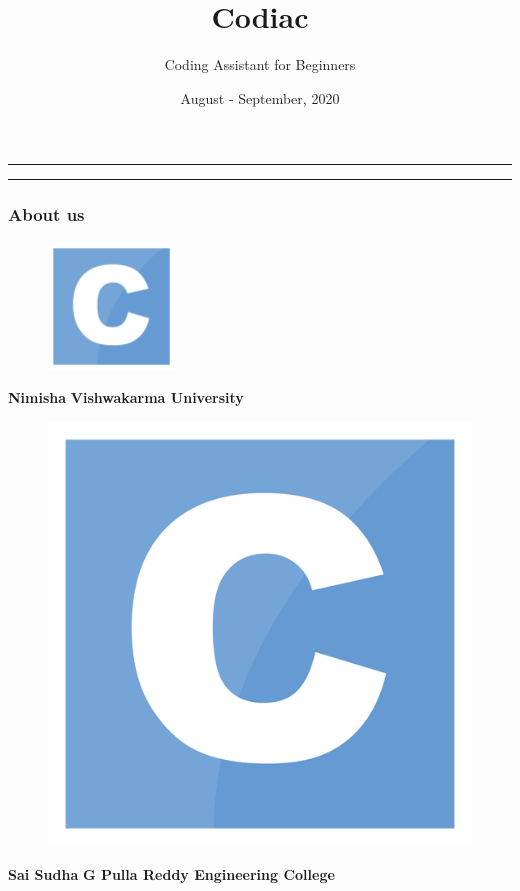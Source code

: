 \documentclass[14pt]{beamer}
\title[Codiac]{Codiac}
\author[]{Coding Assistant for Beginners}
\date []{August - September, 2020}
\begin{document}
\begin{frame}
    \noindent
    {\color{pink} \rule{\linewidth}{0.7mm} }
    \titlepage
    \noindent
    {\color{pink} \rule{\linewidth}{0.7mm} }
\end{frame}

\begin{frame}
   \frametitle{About us}
	\begin{minipage}[width=0.3\textwidth]
            \begin{figure}
		    \includegraphics[width=0.3\textwidth]{./Codiac/logos/c.png}
                    \end{figure}
		\textbf{Nimisha}
		\textbf{Vishwakarma University}
	\end{minipage}
	\hfill

	\begin{minipage}[width=0.3\textwidth]
		\begin{figure}   
			\includegraphics[width=\textwidth]{./Codiac/logos/c.png} 
		\end{figure}  
	                         \textbf{Sai Sudha} 
	                        \textbf{G Pulla Reddy Engineering College}            
	\end{minipage}                                                                                                                                                                \hfill     
			

\end{frame}
\end{document}
